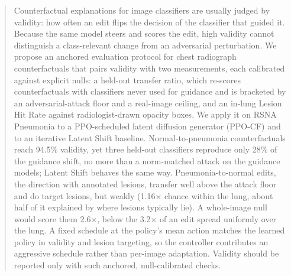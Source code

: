 \begin{abstract}
Counterfactual explanations for image classifiers are usually judged by validity: how often an edit flips the decision of the classifier that guided it. Because the same model steers and scores the edit, high validity cannot distinguish a class-relevant change from an adversarial perturbation. We propose an anchored evaluation protocol for chest radiograph counterfactuals that pairs validity with two measurements, each calibrated against explicit nulls: a held-out transfer ratio, which re-scores counterfactuals with classifiers never used for guidance and is bracketed by an adversarial-attack floor and a real-image ceiling, and an in-lung Lesion Hit Rate against radiologist-drawn opacity boxes. We apply it on RSNA Pneumonia to a PPO-scheduled latent diffusion generator (PPO-CF) and to an iterative Latent Shift baseline. Normal-to-pneumonia counterfactuals reach 94.5\% validity, yet three held-out classifiers reproduce only 28\% of the guidance shift, no more than a norm-matched attack on the guidance models; Latent Shift behaves the same way. Pneumonia-to-normal edits, the direction with annotated lesions, transfer well above the attack floor and do target lesions, but weakly (1.16$\times$ chance within the lung, about half of it explained by where lesions typically lie). A whole-image null would score them 2.6$\times$, below the 3.2$\times$ of an edit spread uniformly over the lung. A fixed schedule at the policy's mean action matches the learned policy in validity and lesion targeting, so the controller contributes an aggressive schedule rather than per-image adaptation. Validity should be reported only with such anchored, null-calibrated checks.
\end{abstract}
